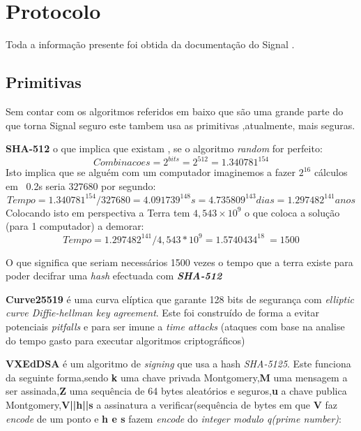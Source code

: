 \section{Protocolo}
Toda a informação presente foi obtida da documentação do Signal \cite{signal}.

\subsection{Primitivas}
Sem contar com os algoritmos referidos em baixo que são uma grande parte do que torna Signal seguro este tambem usa as primitivas ,atualmente, mais seguras.

\textbf{SHA-512} o que implica que existam , se o algoritmo \textit{random} for perfeito:
\begin{equation}
Combinacoes=2^{bits}=2^{512}=1.340781^{154}
\end{equation}
Isto implica que se alguém com um computador imaginemos a fazer $2^16$ cálculos em ~0.2s seria $327680$ por segundo:
\begin{equation}
Tempo = 1.340781^{154} / 327680 = 4.091739^{148}s = 4.735809^{143} dias = 1.297482^{141} anos
\end{equation}
Colocando isto em perspectiva a Terra tem $4,543\times10^9$ o que coloca a solução (para 1 computador) a demorar:
\begin{equation}
Tempo = 1.297482^{141} /4,543*10^{9} = 1.5740434^{18} ~= 1500    
\end{equation}

O que significa que seriam necessários 1500 vezes o tempo que a terra existe para poder decifrar uma \textit{hash} efectuada com \textbf{\textit{SHA-512}}

\textbf{Curve25519} é uma curva elíptica que garante 128 bits de segurança com \textit{elliptic curve Diffie-hellman key agreement}. Este foi construído de forma a evitar potenciais \textit{pitfalls} e para ser imune a \textit{time attacks} (ataques com base na analise do tempo gasto para executar algoritmos criptográficos) 

\textbf{VXEdDSA} é um algoritmo de \textit{signing} que usa a hash \textit{SHA-5125}. Este funciona da seguinte forma,sendo \textbf{k} uma chave privada Montgomery,\textbf{M} uma mensagem a ser assinada,\textbf{Z} uma sequência de 64 bytes aleatórios e seguros,\textbf{u} a chave publica Montgomery,\textbf{V||h||s} a assinatura a verificar(sequência de bytes em que \textbf{V} faz \textit{encode} de um ponto e \textbf{h e s} fazem \textit{encode} do \textit{integer modulo q(prime number)}:

